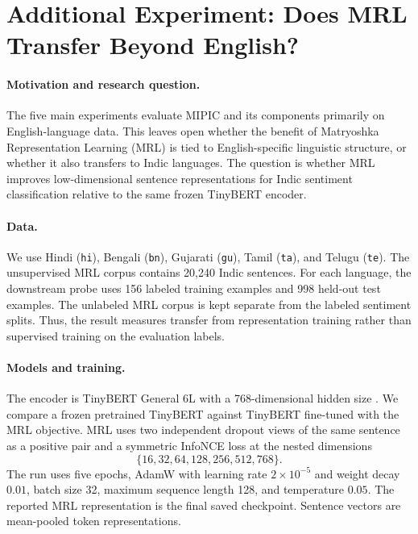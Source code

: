 \section{Additional Experiment: Does MRL Transfer Beyond English?}
\label{sec:additional-indic}

\paragraph{Motivation and research question.}
The five main experiments evaluate MIPIC and its components primarily on
English-language data.  This leaves open whether the benefit of Matryoshka
Representation Learning (MRL) is tied to English-specific linguistic
structure, or whether it also transfers to Indic languages. The question is whether MRL improves
low-dimensional sentence representations for Indic sentiment classification
relative to the same frozen TinyBERT encoder.

\paragraph{Data.}
We use Hindi (\texttt{hi}), Bengali (\texttt{bn}), Gujarati (\texttt{gu}),
Tamil (\texttt{ta}), and Telugu (\texttt{te}).  The unsupervised MRL corpus
contains 20,240 Indic sentences.  For each language, the downstream probe
uses 156 labeled training examples and 998 held-out test examples.  The
unlabeled MRL corpus is kept separate from the labeled sentiment splits.
Thus, the result measures transfer from representation training rather than
supervised training on the evaluation labels.

\paragraph{Models and training.}
The encoder is TinyBERT General 6L with a 768-dimensional hidden size
\citep{jiao-etal-2020-tinybert}.  We compare a frozen pretrained TinyBERT
against TinyBERT fine-tuned with the MRL objective.  MRL uses two independent
dropout views of the same sentence as a positive pair and a symmetric
InfoNCE loss at the nested dimensions
\[
\{16,32,64,128,256,512,768\}.
\]
The run uses five epochs, AdamW with learning rate $2\times10^{-5}$ and
weight decay $0.01$, batch size 32, maximum sequence length 128, and
temperature $0.05$.  The reported MRL representation is the final saved
checkpoint.  Sentence vectors are mean-pooled token representations.


